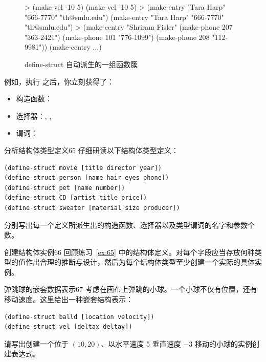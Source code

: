 \begin{figure}[htbp]
  \centering
\begin{replbox}
> (make-vel -10 5)
(make-vel -10 5)
> (make-entry "Tara Harp" "666-7770" "th@smlu.edu")
(make-entry "Tara Harp" "666-7770" "th@smlu.edu")
> (make-centry
   "Shriram Fisler"
   (make-phone 207 "363-2421")
   (make-phone 101 "776-1099")
   (make-phone 208 "112-9981"))
(make-centry ...)
\end{replbox}
  \caption{define-struct 自动派生的一组函数簇}
  \label{fig:struct_functions_derived}
\end{figure}

例如，执行  之后，你立刻获得了：
\begin{itemize}
  \item 构造函数：
  \item 选择器：, , 
  \item 谓词：
\end{itemize}

\begin{exercise}{分析结构体类型定义}{65}
仔细研读以下结构体类型定义：
\begin{lstlisting}[language=BSL]
(define-struct movie [title director year])
(define-struct person [name hair eyes phone])
(define-struct pet [name number])
(define-struct CD [artist title price])
(define-struct sweater [material size producer])
\end{lstlisting}
分别写出每一个定义所派生出的构造函数、选择器以及类型谓词的名字和参数个数。
\end{exercise}

\begin{exercise}{创建结构体实例}{66}
回顾练习~\ref{ex:65} 中的结构体定义。对每个字段应当存放何种类型的值作出合理的推断与设计，然后为每个结构体类型至少创建一个实际的具体实例。
\end{exercise}

\begin{exercise}{弹跳球的嵌套数据表示}{67}
考虑在画布上弹跳的小球。一个小球不仅有位置，还有移动速度。这里给出一种嵌套结构表示：
\begin{lstlisting}[language=BSL]
(define-struct balld [location velocity])
(define-struct vel [deltax deltay])
\end{lstlisting}
请写出创建一个位于 $(10, 20)$、以水平速度 5 垂直速度 $-3$ 移动的小球的实例创建表达式。
\end{exercise}

